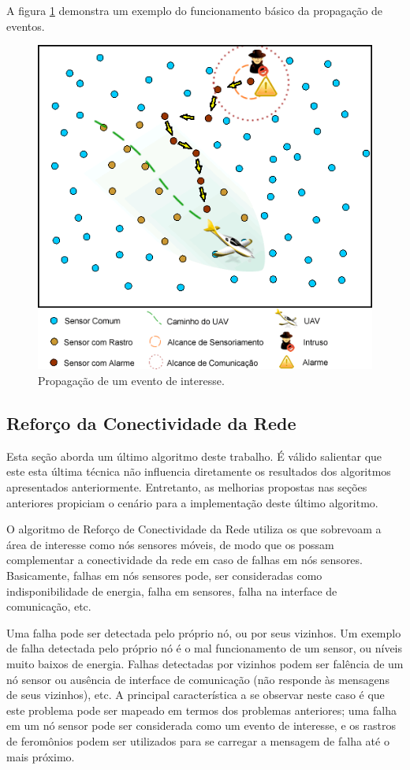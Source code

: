  A figura \ref{fig:app} demonstra um exemplo do funcionamento básico da propagação de eventos.
 

 \begin{figure}[h!]
 \centering
 \includegraphics[width=12cm]{pictures/application.png}
 \caption{Propagação de um evento de interesse.}
  \label{fig:app}
 \end{figure}


\subsection{Reforço da Conectividade da Rede}
Esta seção aborda um último algoritmo deste trabalho. É válido salientar que este esta última técnica não influencia diretamente os resultados dos algoritmos apresentados anteriormente. Entretanto, as melhorias propostas nas seções anteriores propiciam o cenário para a implementação deste último algoritmo.

O algoritmo de Reforço de Conectividade da Rede utiliza os \vants que sobrevoam a área de interesse como nós sensores móveis, de modo que os \vants possam complementar a conectividade da rede em caso de falhas em nós sensores. Basicamente, falhas em nós sensores pode, ser consideradas como indisponibilidade de energia, falha em sensores, falha na interface de comunicação, etc.

Uma falha pode ser detectada pelo próprio nó, ou por seus vizinhos. Um exemplo de falha detectada pelo próprio nó é o mal funcionamento de um sensor, ou níveis muito baixos de energia. Falhas detectadas por vizinhos podem ser falência de um nó sensor ou ausência de interface de comunicação (não responde às mensagens de seus vizinhos), etc. A principal característica a se observar neste caso é que este problema pode ser mapeado em termos dos problemas anteriores; uma falha em um nó sensor pode ser considerada como um evento de interesse, e os rastros de feromônios podem ser utilizados para se carregar a mensagem de falha até o \vant mais próximo.

